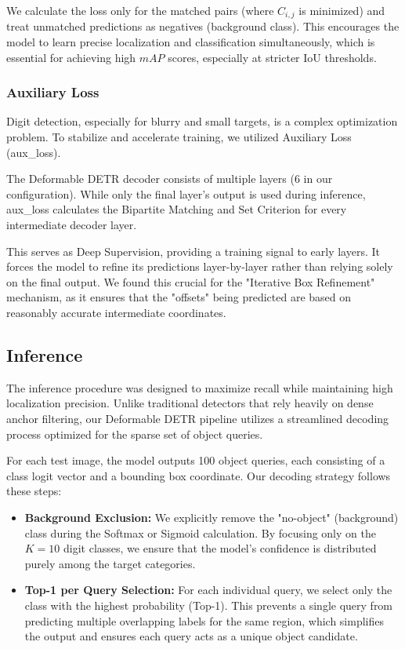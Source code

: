 \documentclass[a4paper]{article} %
\begin{document}
We calculate the loss only for the matched pairs (where $C_{i,j}$ is minimized) and treat unmatched predictions as negatives (background class). This encourages the model to learn precise localization and classification simultaneously, which is essential for achieving high $mAP$ scores, especially at stricter IoU thresholds.

\subsubsection{Auxiliary Loss}

Digit detection, especially for blurry and small targets, is a complex optimization problem. To stabilize and accelerate training, we utilized Auxiliary Loss (aux\_loss).

The Deformable DETR decoder consists of multiple layers (6 in our configuration). While only the final layer's output is used during inference, aux\_loss calculates the Bipartite Matching and Set Criterion for every intermediate decoder layer.

This serves as Deep Supervision, providing a training signal to early layers. It forces the model to refine its predictions layer-by-layer rather than relying solely on the final output. We found this crucial for the "Iterative Box Refinement" mechanism, as it ensures that the "offsets" being predicted are based on reasonably accurate intermediate coordinates.

\subsection{Inference}

The inference procedure was designed to maximize recall while maintaining high localization precision. Unlike traditional detectors that rely heavily on dense anchor filtering, our Deformable DETR pipeline utilizes a streamlined decoding process optimized for the sparse set of object queries.

For each test image, the model outputs 100 object queries, each consisting of a class logit vector and a bounding box coordinate. Our decoding strategy follows these steps:

\begin{itemize}
    \item \textbf{Background Exclusion:} We explicitly remove the "no-object" (background) class during the Softmax or Sigmoid calculation. By focusing only on the $K=10$ digit classes, we ensure that the model's confidence is distributed purely among the target categories.
    \item \textbf{Top-1 per Query Selection:} For each individual query, we select only the class with the highest probability (Top-1). This prevents a single query from predicting multiple overlapping labels for the same region, which simplifies the output and ensures each query acts as a unique object candidate.
\end{itemize}
\end{document}

